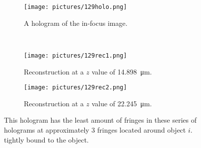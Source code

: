 \begin{figure}[ht!]
    \begin{center}

        \begin{subfigure}[t]{0.4\textwidth}
            \label{fig:129holo}
            \texttt{[image: pictures/129holo.png]}
            \caption{A hologram of the in-focus image.}
        \end{subfigure}
        \\
        \begin{subfigure}[t]{0.4\textwidth}
            \label{fig:129rec1}
            \texttt{[image: pictures/129rec1.png]}
            \caption{Reconstruction at a $z$ value of \SI{14.898}{\micro\meter}.}
        \end{subfigure}
                \hspace*{\fill}
%
        \begin{subfigure}[t]{0.4\textwidth}
            \label{fig:129rec2}
            \texttt{[image: pictures/129rec2.png]}
            \caption{Reconstruction at a $z$ value of \SI{22.245}{\micro\meter}.}
        \end{subfigure}


    \end{center}
    \caption{%
        This hologram has the least amount of fringes in these series of
        holograms at approximately 3 fringes located around object $i.$ tightly
        bound to the object.
    }%
    \label{fig:129}
\end{figure}


